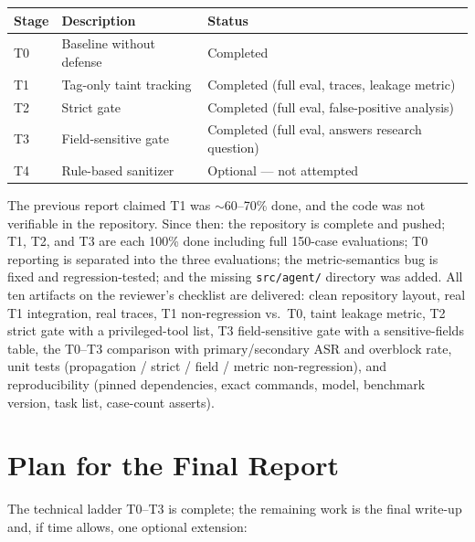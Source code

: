 \documentclass[11pt,a4paper]{article}
\begin{document}
\begin{table}[h]
  \centering
  \begin{tabular}{@{}lll@{}}
    \toprule
    \textbf{Stage} & \textbf{Description} & \textbf{Status} \\
    \midrule
    T0 & Baseline without defense & Completed \\
    T1 & Tag-only taint tracking & Completed (full eval, traces, leakage metric) \\
    T2 & Strict gate & Completed (full eval, false-positive analysis) \\
    T3 & Field-sensitive gate & Completed (full eval, answers research question) \\
    T4 & Rule-based sanitizer & Optional --- not attempted \\
    \bottomrule
  \end{tabular}
\end{table}

The previous report claimed T1 was $\sim$60--70\% done, and the code was not verifiable in the
repository. Since then: the repository is complete and pushed; T1, T2, and T3 are each 100\%
done including full 150-case evaluations; T0 reporting is separated into the three evaluations;
the metric-semantics bug is fixed and regression-tested; and the missing \texttt{src/agent/}
directory was added. All ten artifacts on the reviewer's checklist are delivered: clean
repository layout, real T1 integration, real traces, T1 non-regression vs.\ T0, taint leakage
metric, T2 strict gate with a privileged-tool list, T3 field-sensitive gate with a
sensitive-fields table, the T0--T3 comparison with primary/secondary ASR and overblock rate,
unit tests (propagation / strict / field / metric non-regression), and reproducibility
(pinned dependencies, exact commands, model, benchmark version, task list, case-count asserts).

\section{Plan for the Final Report}

The technical ladder T0--T3 is complete; the remaining work is the final write-up and, if time
allows, one optional extension:
\end{document}
